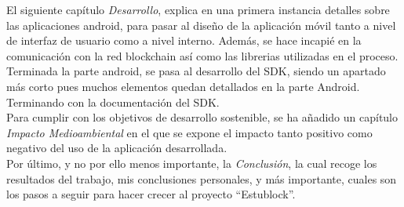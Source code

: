 El siguiente capítulo \emph{Desarrollo}, explica en una primera instancia detalles sobre las aplicaciones android, para pasar al diseño de la aplicación móvil tanto a nivel de interfaz de usuario como a nivel interno. Además, se hace incapié en la comunicación con la red blockchain así como las librerias utilizadas en el proceso. Terminada la parte android, se pasa al desarrollo del SDK, siendo un apartado más corto pues muchos elementos quedan detallados en la parte Android. Terminando con la documentación del SDK. \\

Para cumplir con los objetivos de desarrollo sostenible, se ha añadido un capítulo \emph{Impacto Medioambiental} en el que se expone el impacto tanto positivo como negativo del uso de la aplicación desarrollada. \\

Por último, y no por ello menos importante, la \emph{Conclusión}, la cual recoge los resultados del trabajo, mis conclusiones personales, y más importante, cuales son los pasos a seguir para hacer crecer al proyecto ``Estublock''.
